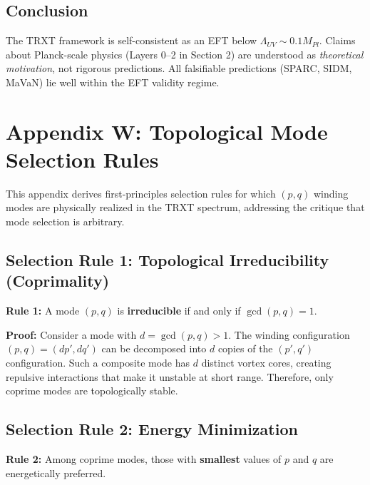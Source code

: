 \documentclass[a4paper,12pt]{article}
\begin{document}
\subsection{Conclusion}

The TRXT framework is self-consistent as an EFT below $\Lambda_{UV} \sim 0.1 M_{Pl}$. Claims about Planck-scale physics (Layers 0–2 in Section 2) are understood as \textit{theoretical motivation}, not rigorous predictions. All falsifiable predictions (SPARC, SIDM, MaVaN) lie well within the EFT validity regime.

\section{Appendix W: Topological Mode Selection Rules}

This appendix derives first-principles selection rules for which $(p,q)$ winding modes are physically realized in the TRXT spectrum, addressing the critique that mode selection is arbitrary.

\subsection{Selection Rule 1: Topological Irreducibility (Coprimality)}

\begin{mdframed}[backgroundcolor=blue!5]
\textbf{Rule 1:} A mode $(p,q)$ is \textbf{irreducible} if and only if $\gcd(p,q) = 1$.
\end{mdframed}

\textbf{Proof:} Consider a mode with $d = \gcd(p,q) > 1$. The winding configuration $(p,q) = (dp', dq')$ can be decomposed into $d$ copies of the $(p', q')$ configuration. Such a composite mode has $d$ distinct vortex cores, creating repulsive interactions that make it unstable at short range. Therefore, only coprime modes are topologically stable.

\subsection{Selection Rule 2: Energy Minimization}

\textbf{Rule 2:} Among coprime modes, those with \textbf{smallest} values of $p$ and $q$ are energetically preferred.
\end{document}
